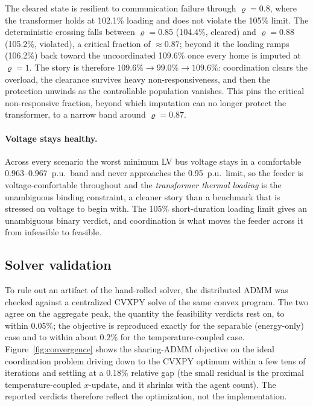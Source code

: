 The cleared state is resilient to communication failure through $\varrho = 0.8$,
where the transformer holds at 102.1\% loading and does not violate the 105\%
limit. The deterministic crossing falls between $\varrho = 0.85$ (104.4\%,
cleared) and $\varrho = 0.88$ (105.2\%, violated), a critical fraction of
$\approx 0.87$; beyond it the loading ramps (106.2\%) back toward the
uncoordinated 109.6\% once every home is imputed at $\varrho = 1$. The story is
therefore $109.6\% \rightarrow 99.0\% \rightarrow 109.6\%$: coordination clears
the overload, the clearance survives heavy non-responsiveness, and then the
protection unwinds as the controllable population vanishes. This pins the critical
non-responsive fraction, beyond which imputation can no longer protect the
transformer, to a narrow band around $\varrho = 0.87$.

\paragraph{Voltage stays healthy.} Across every scenario the worst minimum LV bus
voltage stays in a comfortable $0.963$--$0.967$~p.u.\ band and never approaches
the 0.95~p.u.\ limit, so the feeder is voltage-comfortable throughout and the
\emph{transformer thermal loading} is the unambiguous binding constraint, a
cleaner story than a benchmark that is stressed on voltage to begin with. The
105\% short-duration loading limit gives an unambiguous binary verdict, and
coordination is what moves the feeder across it from infeasible to feasible.

\subsection{Solver validation}
To rule out an artifact of the hand-rolled solver, the distributed ADMM was
checked against a centralized CVXPY solve of the same convex program. The two
agree on the aggregate peak, the quantity the feasibility verdicts rest on,
to within $0.05\%$; the objective is reproduced exactly for the separable
(energy-only) case and to within about $0.2\%$ for the temperature-coupled case.
Figure~\ref{fig:convergence} shows the sharing-ADMM objective on the ideal
coordination problem driving down to the CVXPY optimum within a few tens of
iterations and settling at a $0.18\%$ relative gap (the small residual is the
proximal temperature-coupled $x$-update, and it shrinks with the agent count). The
reported verdicts therefore reflect the optimization, not the implementation.

